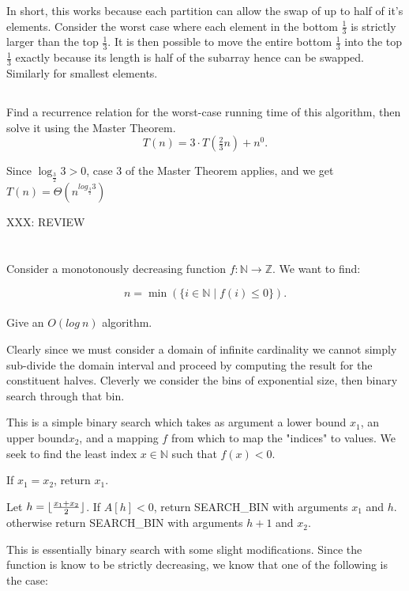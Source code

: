 \documentclass{amsart}
\theoremstyle{definition}
\theoremstyle{remark}
\numberwithin{equation}{section}
\newcommand{\NN}{\mathbb N}
\newcommand{\ZZ}{\mathbb Z}
\DeclarePairedDelimiter{\floor}{\lfloor}{\rfloor}
\begin{document}
In short, this works because each partition can allow the swap of up to
half of it's elements. Consider the worst case where each element in the
bottom $\frac{1}{3}$ is strictly larger than the top $\frac{1}{3}$. It
is then possible to move the entire bottom $\frac{1}{3}$ into the top
$\frac{1}{3}$ exactly because its length is half of the subarray hence
can be swapped. Similarly for smallest elements.

\subsection{} Find a recurrence relation for the worst-case running time of this algorithm, then solve it using the Master Theorem.
$$ T(n) = 3 \cdot T( \tfrac{2}{3} n) + n^0. $$

Since $\log_{\frac{3}{2}} {3} > 0$, case 3 of the Master Theorem applies, and we get
$T(n) = \Theta ( n^{log_{\frac{3}{2}} {3}} )$

XXX: REVIEW
\section{} Consider a monotonously decreasing function $f : \NN \rightarrow \ZZ$. We want to find:

$$ n = \min (\{i \in \NN \mid f(i) \leq 0 \}).$$ \\ 

Give an $O(log\ n)$ algorithm.

Clearly since we must consider a domain of infinite cardinality we cannot simply sub-divide the domain interval and proceed by computing the result for the constituent halves. Cleverly we consider the bins of exponential size, then binary search through that bin.


This is a simple binary search which takes as argument a lower bound
$x_1$, an upper bound$x_2$, and a mapping $f$ from which to map the
"indices" to values. We seek to find the least index $x \in \NN$ such
that $f(x) < 0$.

If $x_1 = x_2$, return $x_1$.

Let $h = \floor{\tfrac{x_1 + x_2}{2}}$. If $A[h] < 0$, return
SEARCH\_BIN with arguments $x_1$ and $h$. otherwise return 
SEARCH\_BIN with arguments $h+1$ and $x_2$.

\proof

This is essentially binary search with some slight modifications.
Since the function is know to be strictly decreasing, we know that
one of the following is the case:
\end{document}
